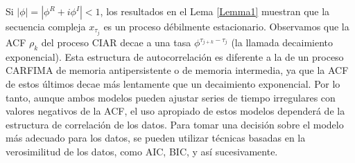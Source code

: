  Si $|\phi|=\left|\phi^{R}+i \phi^{I}\right|<1$, los resultados en el Lema \ref{Lemma1} muestran que la secuencia compleja $x_{\tau_{j}}$ es un proceso débilmente estacionario. 
 Observamos que la ACF $\rho_{k}$ del proceso CIAR decae a una tasa $\phi^{\tau_{j+k}-\tau_{j}}$ (la llamada decaimiento exponencial). Esta estructura de autocorrelación es diferente a la de un proceso CARFIMA de memoria antipersistente o de memoria intermedia, ya que la ACF de estos últimos decae más lentamente que un decaimiento exponencial. Por lo tanto, aunque ambos modelos pueden ajustar series de tiempo irregulares con valores negativos de la ACF, el uso apropiado de estos modelos dependerá de la estructura de correlación de los datos. Para tomar una decisión sobre el modelo más adecuado para los datos, se pueden utilizar técnicas basadas en la verosimilitud de los datos, como AIC, BIC, y así sucesivamente.